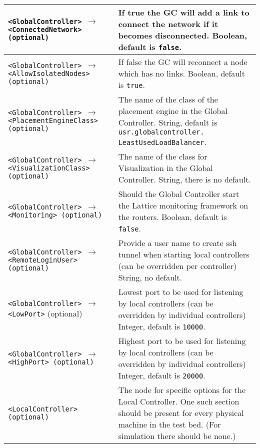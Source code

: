 {\begin{longtable}{ | p{7.5cm} | p{6.5cm} | }
\hline
\footnotesize{\texttt{<GlobalController> $\rightarrow$ <ConnectedNetwork> (optional)}} &
If true the GC will add a link to connect the network if it becomes
disconnected.
\newline
Boolean, default is \texttt{false}.
\\
\hline
\footnotesize{\texttt{<GlobalController> $\rightarrow$ <AllowIsolatedNodes> (optional)}} &
If false the GC will reconnect a node which has no links.
\newline
Boolean, default is \texttt{true}.
\\
\hline
\footnotesize{\texttt{<GlobalController> $\rightarrow$ <PlacementEngineClass> (optional)}} &
The name of the class of the placement engine in the Global Controller. 
\newline
String, default is \texttt{usr.globalcontroller. LeastUsedLoadBalancer}.
\\
\hline
\footnotesize{\texttt{<GlobalController> $\rightarrow$ <VisualizationClass> (optional)}} &
The name of the class for Visualization in the Global Controller. 
\newline
String, there is no default.
\\
\hline
\footnotesize{\texttt{<GlobalController> $\rightarrow$ <Monitoring> (optional)}} &
Should the Global Controller start the Lattice monitoring
framework on the routers. 
\newline
Boolean, default is \texttt{false}.
\\
\hline
\footnotesize{\texttt{<GlobalController> $\rightarrow$ <RemoteLoginUser> (optional) }} &
Provide a user name to create ssh tunnel when starting local
controllers (can be overridden per controller)
\newline
String, no default.
\\
\hline
\footnotesize{\texttt{<GlobalController> $\rightarrow$ <LowPort>} (optional)} &
Lowest port to be used for listening by local controllers (can
be overridden by individual controllers)
\newline
Integer, default is \texttt{10000}.
\\
\hline
\footnotesize{\texttt{<GlobalController> $\rightarrow$ <HighPort> (optional)}} &
Highest port to be used for listening by local controllers (can
be overridden by individual controllers)
\newline
Integer, default is \texttt{20000}.
\\
\hline 
\hline


\hline 
\footnotesize{\texttt{<LocalController> (optional)}} &
The node for specific options for  the Local Controller. 
One such section should be present for every physical
machine in the test bed.  (For simulation there should be none.)\\


\end{longtable}}
